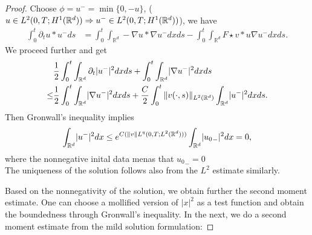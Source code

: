 \begin{proof}
     Choose $\phi  = u^{-} = \min \{0,-u\}  $, ($u \in  L^{2}(0,T;H^{1}(\mathbb{R}^d) ) \Rightarrow u^{-} \in  L^{2}(0,T;H^{1}(\mathbb{R}^d) ) $), we have 
     \begin{align*}
       \int_0^{t}  \partial_t u * u^{-} ds &= \int_0^{t}  \int_{\mathbb{R}^{d} } - \nabla u * \nabla u^{-} dx ds - \int_{0}^{t}  \int_{\mathbb{R}^{d} } F \star  v * u \nabla u^{-} dx ds 
     .\end{align*}
We proceed further and get
     \begin{align*}
       &\frac{1}{2}\int_0^{t} \int_{\mathbb{R}^{d} } \partial_t \lvert u^{-}\rvert^2 dx ds+ \int_0^{t}  \int_{\mathbb{R}^{d} } \lvert\nabla u^{-}\rvert^2 dx ds \\
       \le &\frac{1}{2}\int_0^{t}  \int_{\mathbb{R}^{d} } \lvert\nabla u^{-}\rvert^2 dx ds + \frac{C}{2} \int_0^{t} \|v(\cdot,s)\|_{L^2(\mathbb{R}^d)}\int_{\mathbb{R}^{d} }\lvert u^{-}\rvert^2 dx ds
     .\end{align*}
    Then Gronwall's inequality implies
     \begin{align*}
       \int_{\mathbb{R}^{d} } \lvert u^-\rvert^2 dx \le  e^{C(\|v\|{L^q(0,T;L^2(\mathbb{R}^d))})} \int_{\mathbb{R}^{d} } \lvert{u_{0}}_-\rvert^2 dx = 0
     ,\end{align*}
      where the nonnegative inital data menas that ${u_{0}}_- = 0$\\[1ex]
      
     The uniqueness of the solution follows also from the $L^2$ estimate similarly.

\vskip3mm
Based on the nonnegativity of the solution, we obtain further the second moment estimate. One can choose a mollified version of $|x|^2$ as a test function and obtain the boundedness through Gronwall's inequality. In the next, we do a second moment estimate from the mild solution formulation:


\end{proof}
